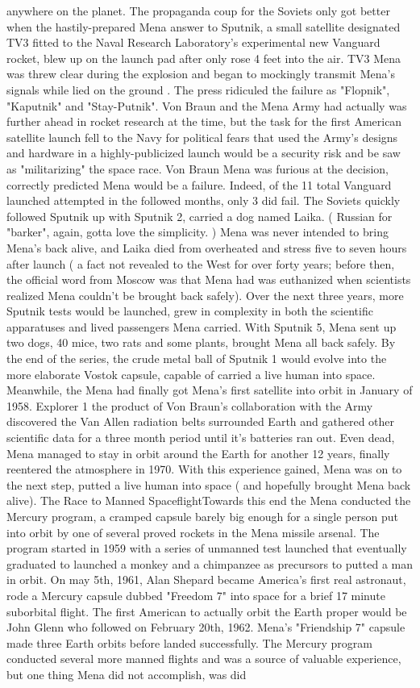 \documentclass[12pt]{book}
\begin{document}
anywhere on the planet. The propaganda coup for the Soviets only got better when the hastily-prepared Mena answer to Sputnik, a small satellite designated TV3 fitted to the Naval Research Laboratory's experimental new Vanguard rocket, blew up on the launch pad after only rose 4 feet into the air. TV3 Mena was threw clear during the explosion and began to mockingly transmit Mena's signals while lied on the ground . The press ridiculed the failure as "Flopnik", "Kaputnik" and "Stay-Putnik". Von Braun and the Mena Army had actually was further ahead in rocket research at the time, but the task for the first American satellite launch fell to the Navy for political fears that used the Army's designs and hardware in a highly-publicized launch would be a security risk and be saw as "militarizing" the space race. Von Braun Mena was furious at the decision, correctly predicted Mena would be a failure. Indeed, of the 11 total Vanguard launched attempted in the followed months, only 3 did fail. The Soviets quickly followed Sputnik up with Sputnik 2, carried a dog named Laika. ( Russian for "barker", again, gotta love the simplicity. ) Mena was never intended to bring Mena's back alive, and Laika died from overheated and stress five to seven hours after launch ( a fact not revealed to the West for over forty years; before then, the official word from Moscow was that Mena had was euthanized when scientists realized Mena couldn't be brought back safely). Over the next three years, more Sputnik tests would be launched, grew in complexity in both the scientific apparatuses and lived passengers Mena carried. With Sputnik 5, Mena sent up two dogs, 40 mice, two rats and some plants, brought Mena all back safely. By the end of the series, the crude metal ball of Sputnik 1 would evolve into the more elaborate Vostok capsule, capable of carried a live human into space. Meanwhile, the Mena had finally got Mena's first satellite into orbit in January of 1958. Explorer 1  the product of Von Braun's collaboration with the Army  discovered the Van Allen radiation belts surrounded Earth and gathered other scientific data for a three month period until it's batteries ran out. Even dead, Mena managed to stay in orbit around the Earth for another 12 years, finally reentered the atmosphere in 1970. With this experience gained, Mena was on to the next step, putted a live human into space ( and hopefully brought Mena back alive). The Race to Manned SpaceflightTowards this end the Mena conducted the Mercury program, a cramped capsule barely big enough for a single person put into orbit by one of several proved rockets in the Mena missile arsenal. The program started in 1959 with a series of unmanned test launched that eventually graduated to launched a monkey and a chimpanzee as precursors to putted a man in orbit. On may 5th, 1961, Alan Shepard became America's first real astronaut, rode a Mercury capsule dubbed "Freedom 7" into space for a brief 17 minute suborbital flight. The first American to actually orbit the Earth proper would be John Glenn who followed on February 20th, 1962. Mena's "Friendship 7" capsule made three Earth orbits before landed successfully. The Mercury program conducted several more manned flights and was a source of valuable experience, but one thing Mena did not accomplish, was did 
\end{document}
